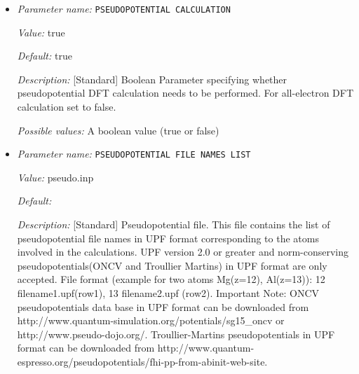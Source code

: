\begin{itemize}
{\it Value:} 1


{\it Default:} 1


{\it Description:} [Standard] NUMBER OF IMAGES:Default option is 1. When NEB is triggered this controls the total number of images along the MEP including the end points


{\it Possible values:} An integer $n$ such that $1\leq n \leq 50$
\item {\it Parameter name:} {\tt PSEUDOPOTENTIAL CALCULATION}
\label{parameters:DFT functional parameters/PSEUDOPOTENTIAL CALCULATION}
\label{parameters:DFT_20functional_20parameters/PSEUDOPOTENTIAL_20CALCULATION}


{\it Value:} true


{\it Default:} true


{\it Description:} [Standard] Boolean Parameter specifying whether pseudopotential DFT calculation needs to be performed. For all-electron DFT calculation set to false.


{\it Possible values:} A boolean value (true or false)
\item {\it Parameter name:} {\tt PSEUDOPOTENTIAL FILE NAMES LIST}
\label{parameters:DFT functional parameters/PSEUDOPOTENTIAL FILE NAMES LIST}
\label{parameters:DFT_20functional_20parameters/PSEUDOPOTENTIAL_20FILE_20NAMES_20LIST}


{\it Value:} pseudo.inp


{\it Default:} 


{\it Description:} [Standard] Pseudopotential file. This file contains the list of pseudopotential file names in UPF format corresponding to the atoms involved in the calculations. UPF version 2.0 or greater and norm-conserving pseudopotentials(ONCV and Troullier Martins) in UPF format are only accepted. File format (example for two atoms Mg(z=12), Al(z=13)): 12 filename1.upf(row1), 13 filename2.upf (row2). Important Note: ONCV pseudopotentials data base in UPF format can be downloaded from http://www.quantum-simulation.org/potentials/sg15_oncv or http://www.pseudo-dojo.org/.  Troullier-Martins pseudopotentials in UPF format can be downloaded from http://www.quantum-espresso.org/pseudopotentials/fhi-pp-from-abinit-web-site.



\end{itemize}
